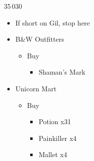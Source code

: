 \documentclass{report}
\begin{document}
\begin{shop}{35\,030}
\begin{itemize}
    \item If short on Gil, stop here
    \item B\&W Outfitters
    \begin{itemize}
        \item Buy
        \begin{itemize}
            \item Shaman's Mark
        \end{itemize}
    \end{itemize}
    \item Unicorn Mart
    \begin{itemize}
        \item Buy
        \begin{itemize}
            \item Potion x31
            \item Painkiller x4
            \item Mallet x4
        \end{itemize}
    \end{itemize}
\end{itemize}
\end{shop}
\end{document}
